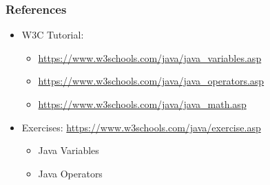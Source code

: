 \documentclass{beamer}
\begin{document}
	\begin{frame}
		\frametitle{References}
		\begin{itemize}
			\item W3C Tutorial: 
			\begin{itemize}
				\item \url{https://www.w3schools.com/java/java\_variables.asp}
				\item \url{https://www.w3schools.com/java/java\_operators.asp}
				\item \url{https://www.w3schools.com/java/java\_math.asp}
			\end{itemize}
			\item Exercises: \url{https://www.w3schools.com/java/exercise.asp}
			\begin{itemize}
				\item Java Variables
				\item Java Operators
			\end{itemize}
		\end{itemize}
	\end{frame}
\end{document}
